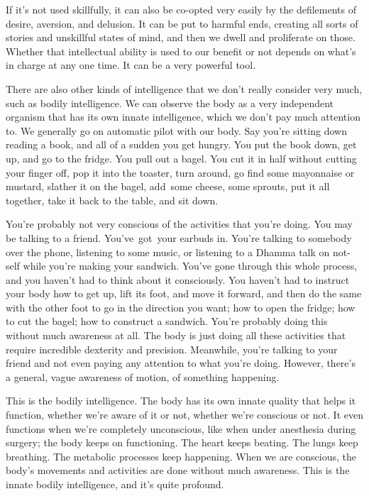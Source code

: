 If it's not used skillfully, it can also be co-opted very easily by the defilements of desire, aversion, and delusion. It can be put to harmful ends, creating all sorts of stories and unskillful states of mind, and then we dwell and proliferate on those. Whether that intellectual ability is used to our benefit or not depends on what's in charge at any one time. It can be a very powerful tool.

There are also other kinds of intelligence that we don't really consider very much, such as bodily intelligence. We can observe the body as a very independent organism that has its own innate intelligence, which we don't pay much attention to. We generally go on automatic pilot with our body. Say you're sitting down reading a book, and all of a sudden you get hungry. You put the book down, get up, and go to the fridge. You pull out a bagel. You cut it in half without cutting your finger off, pop it into the toaster, turn around, go find some mayonnaise or mustard, slather it on the bagel, \mbox{add some} cheese, some sprouts, put it all together, take it back to the table, and sit down.

You're probably not very conscious of the activities that you're doing. You may be talking to a friend. \mbox{You've got your} earbuds in. You're talking to somebody over the phone, lis\-tening to some music, or listening to a Dhamma talk on not-self while you're making your sandwich. You've gone through this whole process, and you haven't had to think about it consciously. You haven't had to instruct your body how to get up, lift its foot, and move it forward, and then do the same with the other foot to go in the direction you want; how to open the fridge; how to cut the bagel; how to construct a sandwich. You're probably doing this without much awareness at all. The body is just doing all these activities that require incredible dexterity and precision. Meanwhile, you're talking to your friend and not even paying any attention to what you're doing. However, there's a general, vague awareness of motion, of something happening.

This is the bodily intelligence. The body has its own innate quality that helps it function, whether we're aware of it or not, whether we're conscious or not. It even functions when we're completely unconscious, like when under anesthesia during surgery; the body keeps on functioning. The heart keeps beating. The lungs keep breathing. The metabolic processes keep happening. When we are conscious, the body's movements and activities are done without much awareness. This is the innate bodily intelligence, and it's quite profound.

